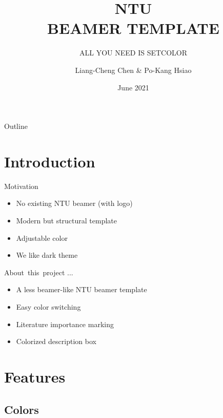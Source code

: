 \documentclass[pdf]{beamer}
\title{NTU \\BEAMER TEMPLATE}
\subtitle{ALL YOU NEED IS SETCOLOR}
\author{Liang-Cheng Chen \& Po-Kang Hsiao}
\date{June 2021}
\begin{document}
 \inserttitlepage

\begin{frame}{Outline}

    \tableofcontents
    
\end{frame}


\section{Introduction}

\begin{frame}{Motivation}

    \begin{itemize}
        \item No existing NTU beamer (with logo)
        \item Modern but structural template
        \item Adjustable color
        \item We like dark theme
    \end{itemize}
    
\end{frame}

\begin{frame}{About\, this\, project ...}

    \begin{itemize}
        \item A less beamer-like NTU beamer template 
        \item Easy color switching
        \item Literature importance marking
        \item Colorized description box
    \end{itemize}
    
\end{frame}


\section{Features}

\subsection{Colors}
\end{document}

